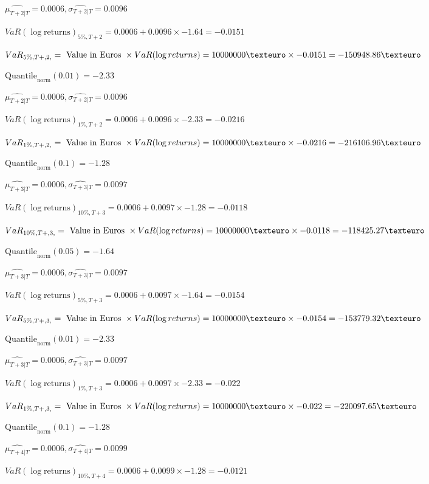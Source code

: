 $\hat{\mu_{T+2|T}} = 0.0006, \hat{\sigma_{T+2|T}} = 0.0096$

$VaR(\log \text{returns})_{5\%, T + 2} = 0.0006 + 0.0096\times-1.64 = -0.0151$

$VaR_{5\%, T + ,2,} = \text{ Value in Euros } \times VaR(\log returns) = 10 000 000 \texteuro \times-0.0151 = -150948.86 \texteuro$


$\text{Quantile}_\text{norm}(0.01) = -2.33$

$\hat{\mu_{T+2|T}} = 0.0006, \hat{\sigma_{T+2|T}} = 0.0096$

$VaR(\log \text{returns})_{1\%, T + 2} = 0.0006 + 0.0096\times-2.33 = -0.0216$

$VaR_{1\%, T + ,2,} = \text{ Value in Euros } \times VaR(\log returns) = 10 000 000 \texteuro \times-0.0216 = -216106.96 \texteuro$


$\text{Quantile}_\text{norm}(0.1) = -1.28$

$\hat{\mu_{T+3|T}} = 0.0006, \hat{\sigma_{T+3|T}} = 0.0097$

$VaR(\log \text{returns})_{10\%, T + 3} = 0.0006 + 0.0097\times-1.28 = -0.0118$

$VaR_{10\%, T + ,3,} = \text{ Value in Euros } \times VaR(\log returns) = 10 000 000 \texteuro \times-0.0118 = -118425.27 \texteuro$


$\text{Quantile}_\text{norm}(0.05) = -1.64$

$\hat{\mu_{T+3|T}} = 0.0006, \hat{\sigma_{T+3|T}} = 0.0097$

$VaR(\log \text{returns})_{5\%, T + 3} = 0.0006 + 0.0097\times-1.64 = -0.0154$

$VaR_{5\%, T + ,3,} = \text{ Value in Euros } \times VaR(\log returns) = 10 000 000 \texteuro \times-0.0154 = -153779.32 \texteuro$


$\text{Quantile}_\text{norm}(0.01) = -2.33$

$\hat{\mu_{T+3|T}} = 0.0006, \hat{\sigma_{T+3|T}} = 0.0097$

$VaR(\log \text{returns})_{1\%, T + 3} = 0.0006 + 0.0097\times-2.33 = -0.022$

$VaR_{1\%, T + ,3,} = \text{ Value in Euros } \times VaR(\log returns) = 10 000 000 \texteuro \times-0.022 = -220097.65 \texteuro$


$\text{Quantile}_\text{norm}(0.1) = -1.28$

$\hat{\mu_{T+4|T}} = 0.0006, \hat{\sigma_{T+4|T}} = 0.0099$

$VaR(\log \text{returns})_{10\%, T + 4} = 0.0006 + 0.0099\times-1.28 = -0.0121$

